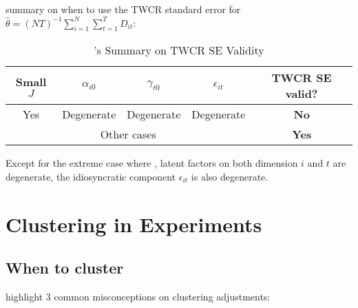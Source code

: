 \documentclass[twoside]{article}
\begin{document}
summary on when to use the TWCR standard error for $\hat{\theta}=\left(NT\right)^{-1}\sum^N_{i=1}\sum^T_{t=1}D_{it}$:
\begin{table}[h!]
    \caption{\citet{chiang2023using}'s Summary on TWCR SE Validity}
    \begin{center}
        \begin{tabular}{ccccc}
        Small $J$ & $\alpha_{i0}$ & $\gamma_{t0}$ & $\epsilon_{it}$ & TWCR SE valid? \\ \hline
        Yes  & Degenerate & Degenerate & Degenerate & \textbf{No} \\
        \multicolumn{4}{c}{Other cases} & \textbf{Yes}
        \end{tabular}
    \end{center}
\end{table}
Except for the extreme case where , latent factors on both dimension $i$ and $t$ are degenerate, the idiosyncratic component $\epsilon_{it}$ is also degenerate.

\section{Clustering in Experiments}
\subsection{When to cluster}
\citet{abadie2023should} highlight 3 common misconceptions on clustering adjustments:

\newpage


\end{document}
